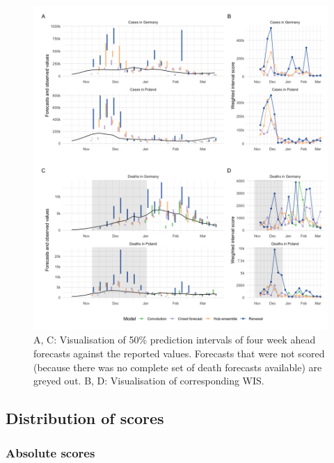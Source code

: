 \documentclass[10pt,letterpaper]{article}
\begin{document}
\begin{figure}[H]
\includegraphics[width=1\linewidth,]{../analysis/plots/figure-forecasts-4} \caption{A, C: Visualisation of 50\% prediction intervals of four week ahead forecasts against the reported values. Forecasts that were not scored (because there was no complete set of death forecasts available) are greyed out. B, D: Visualisation of corresponding WIS.}\label{fig:forecasts-and-truth-4}
\end{figure}

\clearpage

\hypertarget{distribution-of-scores}{%
\subsection{Distribution of scores}\label{distribution-of-scores}}

\hypertarget{absolute-scores}{%
\subsubsection{Absolute scores}\label{absolute-scores}}
\end{document}
